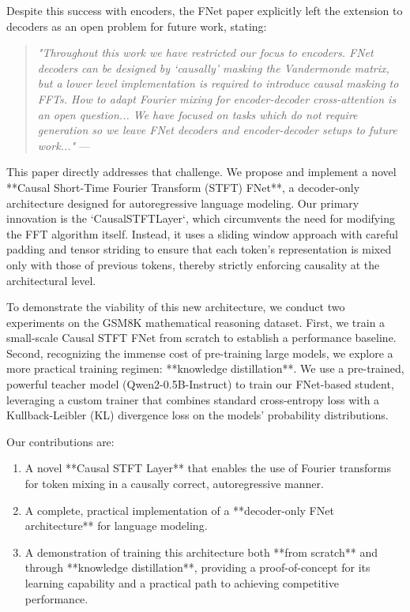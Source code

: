 \documentclass[11pt,a4paper]{article}
\begin{document}
Despite this success with encoders, the FNet paper explicitly left the extension to decoders as an open problem for future work, stating:

\begin{quote}
    \textit{"Throughout this work we have restricted our focus to encoders. FNet decoders can be designed by `causally' masking the Vandermonde matrix, but a lower level implementation is required to introduce causal masking to FFTs. How to adapt Fourier mixing for encoder-decoder cross-attention is an open question... We have focused on tasks which do not require generation so we leave FNet decoders and encoder-decoder setups to future work..."} --- \citet{lee2021fnet}
\end{quote}

This paper directly addresses that challenge. We propose and implement a novel **Causal Short-Time Fourier Transform (STFT) FNet**, a decoder-only architecture designed for autoregressive language modeling. Our primary innovation is the `CausalSTFTLayer`, which circumvents the need for modifying the FFT algorithm itself. Instead, it uses a sliding window approach with careful padding and tensor striding to ensure that each token's representation is mixed only with those of previous tokens, thereby strictly enforcing causality at the architectural level.

To demonstrate the viability of this new architecture, we conduct two experiments on the GSM8K mathematical reasoning dataset. First, we train a small-scale Causal STFT FNet from scratch to establish a performance baseline. Second, recognizing the immense cost of pre-training large models, we explore a more practical training regimen: **knowledge distillation**. We use a pre-trained, powerful teacher model (Qwen2-0.5B-Instruct) to train our FNet-based student, leveraging a custom trainer that combines standard cross-entropy loss with a Kullback-Leibler (KL) divergence loss on the models' probability distributions.

Our contributions are:
\begin{enumerate}
    \item A novel **Causal STFT Layer** that enables the use of Fourier transforms for token mixing in a causally correct, autoregressive manner.
    \item A complete, practical implementation of a **decoder-only FNet architecture** for language modeling.
    \item A demonstration of training this architecture both **from scratch** and through **knowledge distillation**, providing a proof-of-concept for its learning capability and a practical path to achieving competitive performance.
\end{enumerate}
\end{document}
